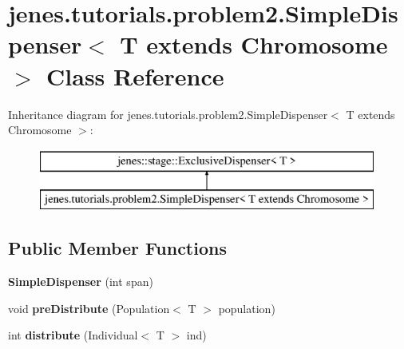 \hypertarget{classjenes_1_1tutorials_1_1problem2_1_1_simple_dispenser_3_01_t_01extends_01_chromosome_01_4}{\section{jenes.\-tutorials.\-problem2.\-Simple\-Dispenser$<$ T extends Chromosome $>$ Class Reference}
\label{classjenes_1_1tutorials_1_1problem2_1_1_simple_dispenser_3_01_t_01extends_01_chromosome_01_4}
}
Inheritance diagram for jenes.\-tutorials.\-problem2.\-Simple\-Dispenser$<$ T extends Chromosome $>$\-:\begin{figure}[H]
\begin{center}
\leavevmode
\includegraphics[height=2.000000cm]{classjenes_1_1tutorials_1_1problem2_1_1_simple_dispenser_3_01_t_01extends_01_chromosome_01_4}
\end{center}
\end{figure}
\subsection*{Public Member Functions}
\begin{DoxyCompactItemize}
\item 
\hypertarget{classjenes_1_1tutorials_1_1problem2_1_1_simple_dispenser_3_01_t_01extends_01_chromosome_01_4_a0c8ee6561c4336810cacc9fb7dad7993}{{\bfseries Simple\-Dispenser} (int span)}\label{classjenes_1_1tutorials_1_1problem2_1_1_simple_dispenser_3_01_t_01extends_01_chromosome_01_4_a0c8ee6561c4336810cacc9fb7dad7993}

\item 
\hypertarget{classjenes_1_1tutorials_1_1problem2_1_1_simple_dispenser_3_01_t_01extends_01_chromosome_01_4_adeddb967a293817fab3f83bd9a04736d}{void {\bfseries pre\-Distribute} (Population$<$ T $>$ population)}\label{classjenes_1_1tutorials_1_1problem2_1_1_simple_dispenser_3_01_t_01extends_01_chromosome_01_4_adeddb967a293817fab3f83bd9a04736d}

\item 
\hypertarget{classjenes_1_1tutorials_1_1problem2_1_1_simple_dispenser_3_01_t_01extends_01_chromosome_01_4_a36cc589e5e73dd601e4bbf62835329ca}{int {\bfseries distribute} (Individual$<$ T $>$ ind)}\label{classjenes_1_1tutorials_1_1problem2_1_1_simple_dispenser_3_01_t_01extends_01_chromosome_01_4_a36cc589e5e73dd601e4bbf62835329ca}

\end{DoxyCompactItemize}



